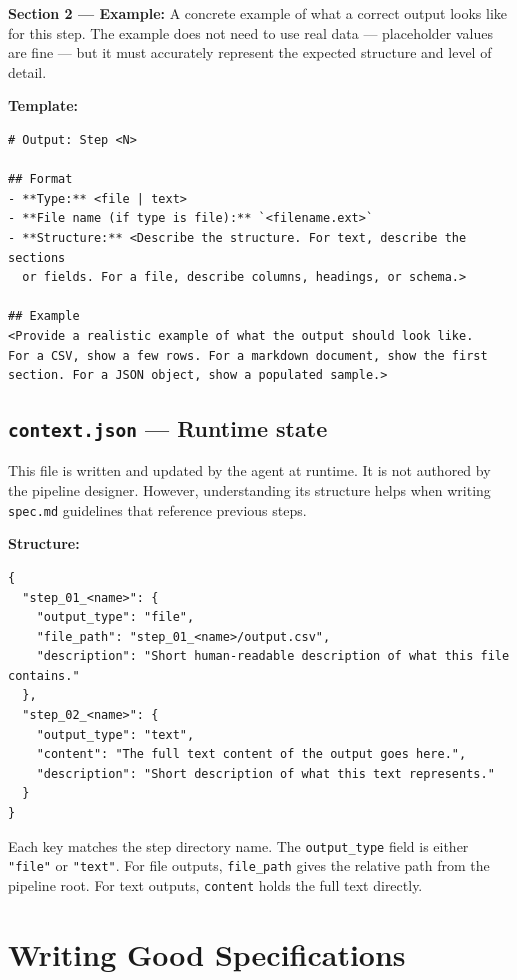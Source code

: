 \documentclass[12pt, a4paper]{article}
\begin{document}
\textbf{Section 2 — Example:} A concrete example of what a correct output looks like for this step. The example does not need to use real data — placeholder values are fine — but it must accurately represent the expected structure and level of detail.

\textbf{Template:}

\begin{lstlisting}[language={}]
# Output: Step <N>

## Format
- **Type:** <file | text>
- **File name (if type is file):** `<filename.ext>`
- **Structure:** <Describe the structure. For text, describe the sections
  or fields. For a file, describe columns, headings, or schema.>

## Example
<Provide a realistic example of what the output should look like.
For a CSV, show a few rows. For a markdown document, show the first
section. For a JSON object, show a populated sample.>
\end{lstlisting}

\subsection{\texttt{context.json} — Runtime state}

This file is written and updated by the agent at runtime. It is not authored by the pipeline designer. However, understanding its structure helps when writing \texttt{spec.md} guidelines that reference previous steps.

\textbf{Structure:}

\begin{lstlisting}[language={}]
{
  "step_01_<name>": {
    "output_type": "file",
    "file_path": "step_01_<name>/output.csv",
    "description": "Short human-readable description of what this file contains."
  },
  "step_02_<name>": {
    "output_type": "text",
    "content": "The full text content of the output goes here.",
    "description": "Short description of what this text represents."
  }
}
\end{lstlisting}

Each key matches the step directory name. The \texttt{output\_type} field is either \texttt{"file"} or \texttt{"text"}. For file outputs, \texttt{file\_path} gives the relative path from the pipeline root. For text outputs, \texttt{content} holds the full text directly.

\section{Writing Good Specifications}
\end{document}
